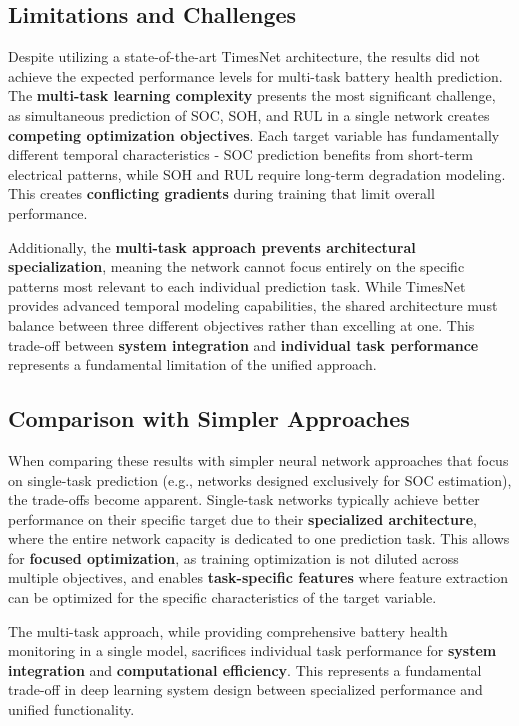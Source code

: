 \subsection{Limitations and Challenges}
\label{subsec:limitations}

Despite utilizing a state-of-the-art TimesNet architecture, the results did not achieve the expected performance levels for multi-task battery health prediction. The \textbf{multi-task learning complexity} presents the most significant challenge, as simultaneous prediction of SOC, SOH, and RUL in a single network creates \textbf{competing optimization objectives}. Each target variable has fundamentally different temporal characteristics - SOC prediction benefits from short-term electrical patterns, while SOH and RUL require long-term degradation modeling. This creates \textbf{conflicting gradients} during training that limit overall performance.

Additionally, the \textbf{multi-task approach prevents architectural specialization}, meaning the network cannot focus entirely on the specific patterns most relevant to each individual prediction task. While TimesNet provides advanced temporal modeling capabilities, the shared architecture must balance between three different objectives rather than excelling at one. This trade-off between \textbf{system integration} and \textbf{individual task performance} represents a fundamental limitation of the unified approach.

\subsection{Comparison with Simpler Approaches}
\label{subsec:comparison_simpler}

When comparing these results with simpler neural network approaches that focus on single-task prediction (e.g., networks designed exclusively for SOC estimation), the trade-offs become apparent. Single-task networks typically achieve better performance on their specific target due to their \textbf{specialized architecture}, where the entire network capacity is dedicated to one prediction task. This allows for \textbf{focused optimization}, as training optimization is not diluted across multiple objectives, and enables \textbf{task-specific features} where feature extraction can be optimized for the specific characteristics of the target variable.

The multi-task approach, while providing comprehensive battery health monitoring in a single model, sacrifices individual task performance for \textbf{system integration} and \textbf{computational efficiency}. This represents a fundamental trade-off in deep learning system design between specialized performance and unified functionality.



